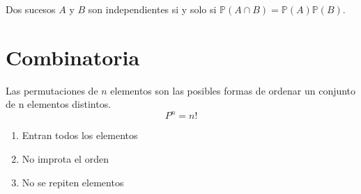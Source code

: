 \begin{ejr}

\end{ejr}

\begin{ejr}

\end{ejr}

\begin{ejr}

\end{ejr}

\begin{ejr}

\end{ejr}

\begin{ejr}

\end{ejr}

\begin{ejr}

\end{ejr}

\begin{ejr}

\end{ejr}

\begin{ejr}

\end{ejr}

\begin{defn}[Independencia]
Dos sucesos $A$ y $B$ son independientes si y solo si $\mathbb{P}(A\cap B) = \mathbb{P}(A)\mathbb{P}(B)$.
\end{defn}

\section{Combinatoria}

\begin{defn}[Permutaciones]
Las permutaciones de $n$ elementos son las posibles formas de ordenar un conjunto de n elementos distintos. \[ P^n = n! \]
\begin{enumerate}[label=(\roman*)]
    \item Entran todos los elementos
    \item No improta el orden
    \item No se repiten elementos
\end{enumerate}
\end{defn}

